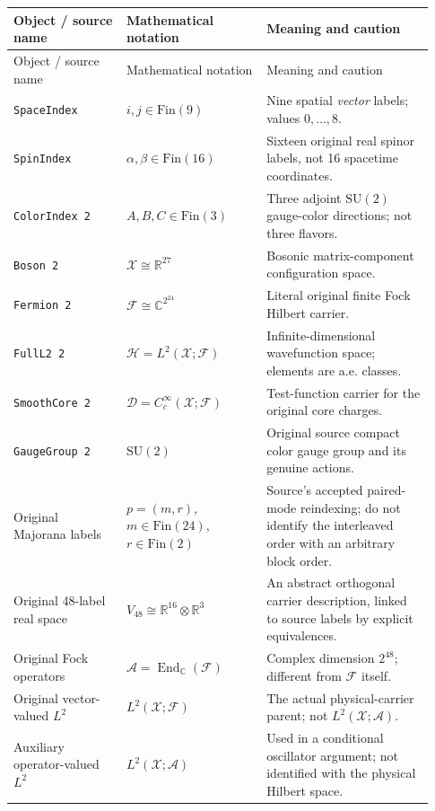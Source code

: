\begin{longtable}{@{}p{0.25\linewidth}p{0.31\linewidth}p{0.37\linewidth}@{}}
\toprule
Object / source name & Mathematical notation & Meaning and caution \\
\midrule
\endfirsthead
\toprule
Object / source name & Mathematical notation & Meaning and caution \\
\midrule
\endhead
\texttt{SpaceIndex} & $i,j\in\mathrm{Fin}(9)$ & Nine spatial \emph{vector} labels; values $0,\ldots,8$. \\
\texttt{SpinIndex} & $\alpha,\beta\in\mathrm{Fin}(16)$ & Sixteen original real spinor labels, not 16 spacetime coordinates. \\
\texttt{ColorIndex 2} & $A,B,C\in\mathrm{Fin}(3)$ & Three adjoint $\mathrm{SU}(2)$ gauge-color directions; not three flavors. \\
\texttt{Boson 2} & $\mathcal X\cong\mathbb R^{27}$ & Bosonic matrix-component configuration space. \\
\texttt{Fermion 2} & $\mathcal F\cong\mathbb C^{2^{24}}$ & Literal original finite Fock Hilbert carrier. \\
\texttt{FullL2 2} & $\mathscr H=L^2(\mathcal X;\mathcal F)$ & Infinite-dimensional wavefunction space; elements are a.e. classes. \\
\texttt{SmoothCore 2} & $\mathscr D=C_c^\infty(\mathcal X;\mathcal F)$ & Test-function carrier for the original core charges. \\
\texttt{GaugeGroup 2} & $\mathrm{SU}(2)$ & Original source compact color gauge group and its genuine actions. \\
Original Majorana labels & $p=(m,r)$, $m\in\mathrm{Fin}(24)$, $r\in\mathrm{Fin}(2)$ & Source's accepted paired-mode reindexing; do not identify the interleaved order with an arbitrary block order. \\
Original 48-label real space & $V_{48}\cong\mathbb R^{16}\otimes\mathbb R^3$ & An abstract orthogonal carrier description, linked to source labels by explicit equivalences. \\
Original Fock operators & $\mathcal A=\operatorname{End}_{\mathbb C}(\mathcal F)$ & Complex dimension $2^{48}$; different from $\mathcal F$ itself. \\
Original vector-valued $L^2$ & $L^2(\mathcal X;\mathcal F)$ & The actual physical-carrier parent; not $L^2(\mathcal X;\mathcal A)$. \\
Auxiliary operator-valued $L^2$ & $L^2(\mathcal X;\mathcal A)$ & Used in a conditional oscillator argument; not identified with the physical Hilbert space. \\
\bottomrule
\end{longtable}

